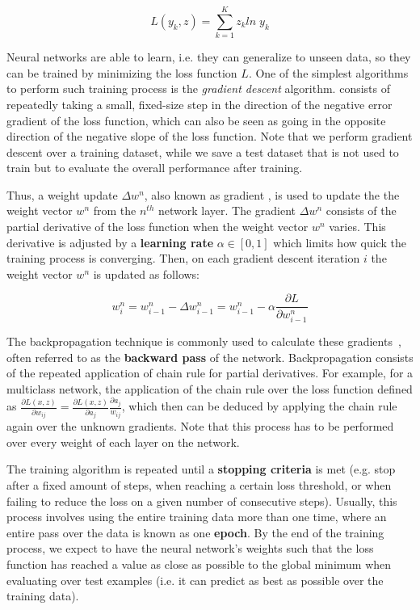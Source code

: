 \[
    L(y_k, z) = \sum_{k=1}^K z_k ln \; y_k
\]

Neural networks are able to learn, i.e. they can generalize to unseen data, so they can be 
trained by minimizing the loss function $L$. One of the simplest algorithms to perform such 
training process is the \textit{gradient descent} algorithm.  consists 
of repeatedly taking a small, fixed-size step in the direction of the negative error gradient 
of the loss function, which can also be seen as going in the opposite direction of the 
negative slope of the loss function. Note that we perform gradient descent over a training 
dataset, while we save a test dataset that is not used to train but to evaluate the overall 
performance after training.

Thus, a weight update $\Delta w^n$, also known as gradient , is used to update the the weight 
vector $w^n$ from the $n^{th}$ network layer. The gradient $\Delta w^n$ consists of the 
partial derivative of the loss function when the weight vector $w^n$ varies. This derivative 
is adjusted by a \textbf{learning rate} $\alpha \in [0, 1]$ which limits how quick the training process 
is converging. Then, on each gradient descent iteration $i$ the weight vector $w^n$ is updated as 
follows:

\[
    w_{i}^n = w_{i-1}^n - \Delta w_{i-1}^n = w_{i-1}^n - \alpha \frac{\partial L}{\partial w_{i-1}^n}
\]

The backpropagation technique is commonly used to calculate these 
gradients~\cite{appendix:rumelhart1985learning, appendix:williams1995gradient, appendix:werbos1988generalization}, 
often referred to as the \textbf{backward pass} of the network. Backpropagation consists of 
the repeated application of chain rule for partial derivatives. For example, for a multiclass 
network, the application of the chain rule over the loss function defined as 
$\frac{\partial L(x, z)}{\partial w_{ij}} = \frac{\partial L(x, z)}{\partial a_j} \frac{\partial a_j}{w_{ij}}$, 
which then can be deduced by applying the chain rule again over the unknown gradients. 
Note that this process has to be performed over every weight of each layer on the network.

The training algorithm is repeated until a \textbf{stopping criteria} is met (e.g. stop after 
a fixed amount of steps, when reaching a certain loss threshold, or when failing to reduce the 
loss on a given number of consecutive steps). Usually, this process involves using the entire 
training data more than one time, where an entire pass over the data is known as one \textbf{epoch}. 
By the end of the training process, we expect to have the neural network’s weights such that 
the loss function has reached a value as close as possible to the global minimum when 
evaluating over test examples (i.e. it can predict as best as possible over the training data).

